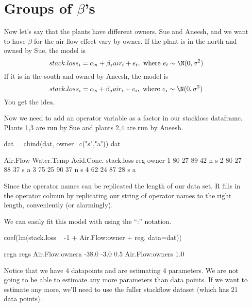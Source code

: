 \section{Groups of $\beta$'s}

Now let's say that the plants have different owners, Sue and Aneesh, and we want to have $\beta$ for the air flow effect vary by owner.  If the plant is in the north and owned by Sue, the model is
\begin{equation}
stack.loss_i = \alpha_n + \beta_s air_i + e_i, \text{ where } e_i \sim \N(0,\sigma^2) 
\end{equation}
If it is in the south and owned by Aneesh, the model is
\begin{equation}
stack.loss_i = \alpha_s + \beta_a air_i + e_i, \text{ where } e_i \sim \N(0,\sigma^2) 
\end{equation}
You get the idea.

Now we need to add an operator variable as a factor in our stackloss dataframe. Plants 1,3 are run by Sue and plants 2,4 are run by Aneesh.
\begin{Schunk}
\begin{Sinput}
 dat = cbind(dat, owner=c("s","a"))
 dat
\end{Sinput}
\begin{Soutput}
  Air.Flow Water.Temp Acid.Conc. stack.loss reg owner
1       80         27         89         42   n     s
2       80         27         88         37   s     a
3       75         25         90         37   n     s
4       62         24         87         28   s     a
\end{Soutput}
\end{Schunk}
Since the operator names can be replicated the length of our data set,  R fills in the operator colmun by replicating our string of operator names to the right length, conveniently (or alarmingly).

We can easily fit this model with \verb@lm@ using the ``:'' notation.
\begin{Schunk}
\begin{Sinput}
 coef(lm(stack.loss ~ -1 + Air.Flow:owner + reg, data=dat))
\end{Sinput}
\begin{Soutput}
           regn            regs Air.Flow:ownera 
          -38.0            -3.0             0.5 
Air.Flow:owners 
            1.0 
\end{Soutput}
\end{Schunk}
Notice that we have 4 datapoints and are estimating 4 parameters.  We are not going to be able to estimate any more parameters than data points.  If we want to estimate any more, we'll need to use the fuller stackflow dataset (which has 21 data points).

